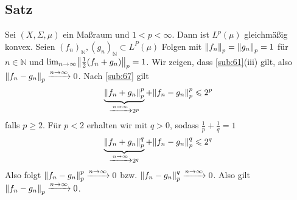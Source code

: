 \subsection[Satz: Für $1 <p <\infty$ ist $L^p(\mu)$ gleichmäßig konvex]{Satz} %
\label{sub:68}
Sei $(X,\Sigma,\mu)$ ein Maßraum und $1 <p < \infty$. Dann ist $L^p(\mu)$ gleichmäßig konvex.
Seien $(f_n)_\mathds{N}, (g_n)_\mathds{N} \subset L^P(\mu)$ Folgen mit $\norm[p]{f_n}= \norm[p]{g_n}= 1 $ für $n \in \mathds{N}$ und 
$\lim_{ n \to \infty} \norm[p]{\frac{1}{2} (f_n+g_n)}=1$. Wir zeigen, dass \ref{sub:61}(iii) gilt, also $\norm[p]{f_n-g_n} \xrightarrow{n \to \infty} 0$. Nach \ref{sub:67}
gilt 
\[
	\underbrace{\norm[p]{f_n+g_n}^p}_{\xrightarrow{n \to \infty} 2^p} + \norm[p]{f_n-g_n}^p \le 2^{p} 
\]
falls $p\ge 2$. Für $p < 2$ erhalten wir mit $q>0$, sodass $\frac{1}{p} +\frac{1}{q}=1$
\[
	\underbrace{\norm[p]{f_n+g_n}^q }_{\xrightarrow{n \to \infty} 2^q}+ \norm[p]{f_n-g_n}^q \le 2^q
\]
Also folgt $\norm[p]{f_n -g_n}^p \xrightarrow{n \to \infty} 0$ bzw. $\norm[p]{f_n-g_n}^q \xrightarrow{n \to \infty} 0$. Also gilt 
$\norm[p]{f_n -g_n} \xrightarrow{n \to \infty} 0$. \bewende

